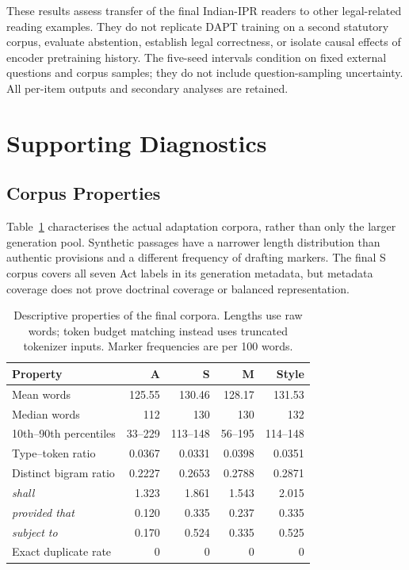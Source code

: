 \documentclass[pdflatex,sn-basic]{sn-jnl}
\begin{document}
These results assess transfer of the final Indian-IPR readers to other
legal-related reading examples. They do not replicate DAPT training
on a second statutory corpus, evaluate abstention, establish legal
correctness, or isolate causal effects of encoder pretraining history.
The five-seed intervals condition on fixed external questions and
corpus samples; they do not include question-sampling uncertainty.
All per-item outputs and secondary analyses are retained.
\FloatBarrier

\section{Supporting Diagnostics}\label{sec:diagnostics}

\subsection{Corpus Properties}\label{sec:corpus_characterisation}

Table~\ref{tab:corpus_characterisation} characterises the actual adaptation
corpora, rather than only the larger generation pool. Synthetic passages
have a narrower length distribution than authentic provisions and a
different frequency of drafting markers. The final S corpus covers all
seven Act labels in its generation metadata, but metadata coverage does
not prove doctrinal coverage or balanced representation.

\begin{table}[!htbp]
\caption{Descriptive properties of the final corpora. Lengths use raw words;
token budget matching instead uses truncated tokenizer inputs.
Marker frequencies are per 100 words.}
\label{tab:corpus_characterisation}
\centering\small
\begin{tabular}{@{}lrrrr@{}}
\toprule
Property & A & S & M & Style \\
\midrule
Mean words & 125.55 & 130.46 & 128.17 & 131.53 \\
Median words & 112 & 130 & 130 & 132 \\
10th--90th percentiles & 33--229 & 113--148 & 56--195 & 114--148 \\
Type--token ratio & 0.0367 & 0.0331 & 0.0398 & 0.0351 \\
Distinct bigram ratio & 0.2227 & 0.2653 & 0.2788 & 0.2871 \\
\emph{shall} & 1.323 & 1.861 & 1.543 & 2.015 \\
\emph{provided that} & 0.120 & 0.335 & 0.237 & 0.335 \\
\emph{subject to} & 0.170 & 0.524 & 0.335 & 0.525 \\
Exact duplicate rate & 0 & 0 & 0 & 0 \\
\bottomrule
\end{tabular}
\end{table}
\end{document}

